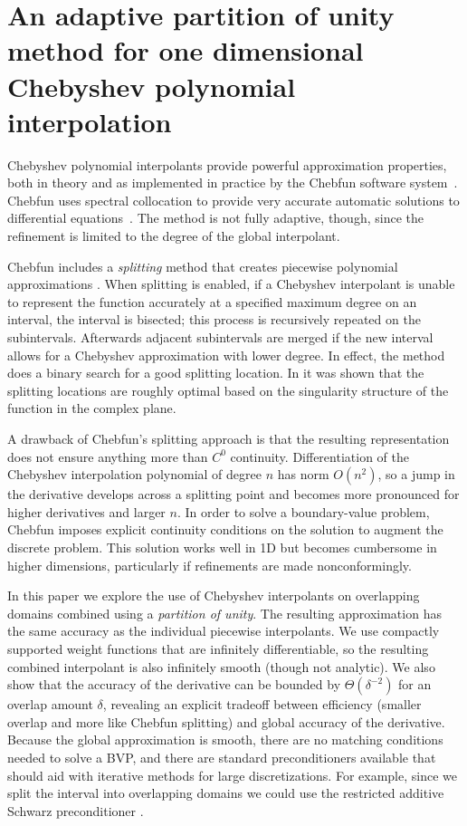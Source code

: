 %
%
\chapter{An adaptive partition of unity method for one dimensional Chebyshev polynomial interpolation}
Chebyshev polynomial interpolants provide powerful approximation properties, both in theory and as implemented in practice by the Chebfun software system~\cite{battles2004extension}. Chebfun uses spectral collocation to provide very accurate automatic solutions to differential equations~\cite{driscoll2008chebop}. The method is not fully adaptive, though, since the refinement is limited to the degree of the global interpolant. 

 Chebfun includes a \textit{splitting} method that creates piecewise polynomial approximations \cite{pachon2010piecewise}. When splitting is enabled, if a Chebyshev interpolant is unable to represent the function accurately at a specified maximum degree on an interval, the interval is bisected; this process is recursively repeated on the subintervals. Afterwards adjacent subintervals are merged if the new interval allows for a Chebyshev approximation with lower degree. In effect, the method does a binary search for a good splitting location. In \cite{driscoll2014optimal} it was shown that the splitting locations are roughly optimal based on the singularity structure of the function in the complex plane. 

A drawback of Chebfun's splitting approach is that the resulting representation does not ensure anything more than $C^0$ continuity. Differentiation of the Chebyshev interpolation polynomial of degree $n$ has norm $O(n^2)$, so a jump in the derivative develops across a splitting point and becomes more pronounced for higher derivatives and larger $n$. In order to solve a boundary-value problem, Chebfun imposes explicit continuity conditions on the solution to augment the discrete problem. This solution works well in 1D but becomes cumbersome in higher dimensions, particularly if refinements are made nonconformingly.

In this paper we explore the use of Chebyshev interpolants on overlapping domains combined using a \emph{partition of unity}. The resulting approximation has the same accuracy as the individual piecewise interpolants. We use compactly supported weight functions that are infinitely differentiable, so the resulting combined interpolant is also infinitely smooth (though not analytic). We also show that the accuracy of the derivative can be bounded by $\Theta(\delta^{-2})$ for an overlap amount $\delta$, revealing an explicit tradeoff between efficiency (smaller overlap and more like Chebfun splitting) and global accuracy of the derivative. Because the global approximation is smooth, there are no matching conditions needed to solve a BVP, and there are standard preconditioners available that should aid with iterative methods for large discretizations. For example, since we split the interval into overlapping domains we could use the restricted additive Schwarz preconditioner \cite{doi:10.1137/S106482759732678X}.

